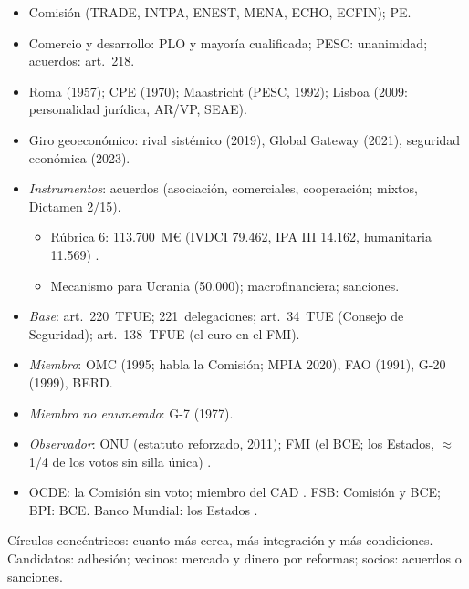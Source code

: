\documentclass{article}
\begin{document}
\begin{columnas}
\begin{itemize}
\item Comisión (TRADE, INTPA, ENEST, MENA, ECHO, ECFIN); PE.
\item Comercio y desarrollo: PLO y mayoría cualificada; PESC: unanimidad; acuerdos: art.~218.
\end{itemize}
\begin{itemize}
\item Roma (1957); CPE (1970); Maastricht (PESC, 1992); Lisboa (2009: personalidad jurídica, AR/VP, SEAE).
\item Giro geoeconómico: rival sistémico (2019), Global Gateway (2021), seguridad económica (2023).
\item \emph{Instrumentos}: acuerdos (asociación, comerciales, cooperación; mixtos, Dictamen 2/15).
  \begin{itemize}
  \item Rúbrica 6: 113.700~M€ (IVDCI 79.462, IPA III 14.162, humanitaria 11.569) .
  \item Mecanismo para Ucrania (50.000); macrofinanciera; sanciones.
  \end{itemize}
\end{itemize}

\begin{itemize}
\item \emph{Base}: art.~220~TFUE; 221~delegaciones; art.~34~TUE (Consejo de Seguridad); art.~138~TFUE (el euro en el FMI).
\item \emph{Miembro}: OMC (1995; habla la Comisión; MPIA 2020), FAO (1991), G-20 (1999), BERD.
\item \emph{Miembro no enumerado}: G-7 (1977).
\item \emph{Observador}: ONU (estatuto reforzado, 2011); FMI (el BCE; los Estados, $\approx$1/4 de los votos sin silla única) .
\item OCDE: la Comisión sin voto; miembro del CAD . FSB: Comisión y BCE; BPI: BCE. Banco Mundial: los Estados .
\end{itemize}

\begin{ideaclave}
Círculos concéntricos: cuanto más cerca, más integración y más condiciones. Candidatos: adhesión; vecinos: mercado y dinero por reformas; socios: acuerdos o sanciones.
\end{ideaclave}


\end{columnas}
\end{document}
